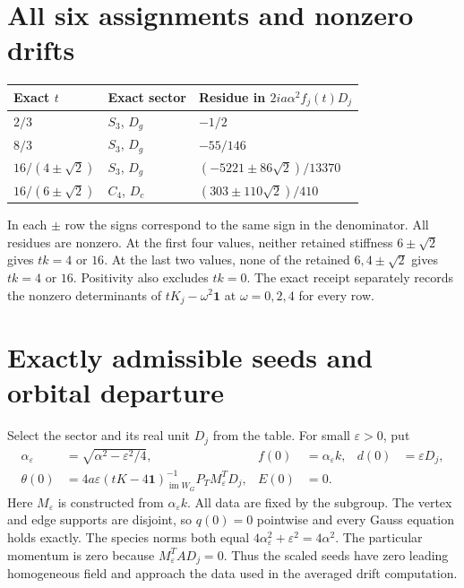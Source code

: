 \documentclass[11pt,a4paper]{article}
\newcommand{\id}{\mathbf1}\newcommand{\tr}{\operatorname{tr}}\newcommand{\diag}{\operatorname{diag}}\newcommand{\Fix}{\operatorname{Fix}}\newcommand{\Rea}{\operatorname{Re}}
\begin{document}
\newpage
\section{All six assignments and nonzero drifts}
\begin{center}
\begin{tabular}{lll}
\toprule
Exact $t$ & Exact sector & Residue in $2ia\alpha^2 f_j(t)D_j$\\
\midrule
$2/3$ & $S_3$, $D_g$ & $-1/2$\\[3pt]
$8/3$ & $S_3$, $D_g$ & $-55/146$\\[3pt]
$16/(4\pm\sqrt2)$ & $S_3$, $D_g$ & $(-5221\pm86\sqrt2)/13370$\\[3pt]
$16/(6\pm\sqrt2)$ & $C_4$, $D_c$ & $(303\pm110\sqrt2)/410$\\
\bottomrule
\end{tabular}
\end{center}
In each $\pm$ row the signs correspond to the same sign in the denominator. All residues are nonzero. At the first four values, neither retained stiffness $6\pm\sqrt2$ gives $tk=4$ or $16$. At the last two values, none of the retained $6,4\pm\sqrt2$ gives $tk=4$ or $16$. Positivity also excludes $tk=0$. The exact receipt separately records the nonzero determinants of $tK_j-\omega^2\id$ at $\omega=0,2,4$ for every row.

\section{Exactly admissible seeds and orbital departure}
Select the sector and its real unit $D_j$ from the table. For small $\varepsilon>0$, put
\begin{align*}
\alpha_\varepsilon&=\sqrt{\alpha^2-\varepsilon^2/4},
&f(0)&=\alpha_\varepsilon k,&d(0)&=\varepsilon D_j,\\
\theta(0)&=4a\varepsilon(tK-4\id)^{-1}_{\operatorname{im}W_G}P_TM_\varepsilon^TD_j,
&E(0)&=0.
\end{align*}
Here $M_\varepsilon$ is constructed from $\alpha_\varepsilon k$. All data are fixed by the subgroup. The vertex and edge supports are disjoint, so $q(0)=0$ pointwise and every Gauss equation holds exactly. The species norms both equal $4\alpha_\varepsilon^2+\varepsilon^2=4\alpha^2$. The particular momentum is zero because $M_\varepsilon^TAD_j=0$. Thus the scaled seeds have zero leading homogeneous field and approach the data used in the averaged drift computation.
\end{document}
